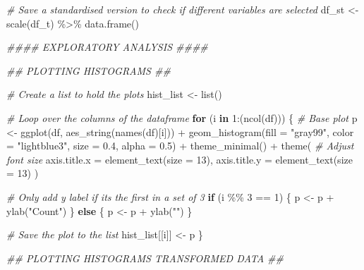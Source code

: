 \documentclass[
  11pt,
]{article}
\newenvironment{Shaded}{}{}
\newcommand{\AttributeTok}[1]{\textcolor[rgb]{0.49,0.56,0.16}{#1}}
\newcommand{\CommentTok}[1]{\textcolor[rgb]{0.38,0.63,0.69}{\textit{#1}}}
\newcommand{\ControlFlowTok}[1]{\textcolor[rgb]{0.00,0.44,0.13}{\textbf{#1}}}
\newcommand{\DecValTok}[1]{\textcolor[rgb]{0.25,0.63,0.44}{#1}}
\newcommand{\DocumentationTok}[1]{\textcolor[rgb]{0.73,0.13,0.13}{\textit{#1}}}
\newcommand{\FloatTok}[1]{\textcolor[rgb]{0.25,0.63,0.44}{#1}}
\newcommand{\FunctionTok}[1]{\textcolor[rgb]{0.02,0.16,0.49}{#1}}
\newcommand{\NormalTok}[1]{#1}
\newcommand{\OtherTok}[1]{\textcolor[rgb]{0.00,0.44,0.13}{#1}}
\newcommand{\SpecialCharTok}[1]{\textcolor[rgb]{0.25,0.44,0.63}{#1}}
\newcommand{\StringTok}[1]{\textcolor[rgb]{0.25,0.44,0.63}{#1}}
\begin{document}
\begin{Shaded}
\begin{Highlighting}[]
\CommentTok{\# Save a standardised version to check if different variables are selected}
\NormalTok{df\_st }\OtherTok{\textless{}{-}} \FunctionTok{scale}\NormalTok{(df\_t) }\SpecialCharTok{\%\textgreater{}\%} \FunctionTok{data.frame}\NormalTok{()}


\DocumentationTok{\#\#\#\# EXPLORATORY ANALYSIS \#\#\#\#}

\DocumentationTok{\#\# PLOTTING HISTOGRAMS \#\#}

\CommentTok{\# Create a list to hold the plots}
\NormalTok{hist\_list }\OtherTok{\textless{}{-}} \FunctionTok{list}\NormalTok{()}

\CommentTok{\# Loop over the columns of the dataframe}
\ControlFlowTok{for}\NormalTok{ (i }\ControlFlowTok{in} \DecValTok{1}\SpecialCharTok{:}\NormalTok{(}\FunctionTok{ncol}\NormalTok{(df))) \{}
  \CommentTok{\# Base plot}
\NormalTok{  p }\OtherTok{\textless{}{-}} \FunctionTok{ggplot}\NormalTok{(df, }\FunctionTok{aes\_string}\NormalTok{(}\FunctionTok{names}\NormalTok{(df)[i])) }\SpecialCharTok{+} 
    \FunctionTok{geom\_histogram}\NormalTok{(}\AttributeTok{fill =} \StringTok{"gray99"}\NormalTok{, }\AttributeTok{color =} \StringTok{"lightblue3"}\NormalTok{, }\AttributeTok{size =} \FloatTok{0.4}\NormalTok{, }\AttributeTok{alpha =} \FloatTok{0.5}\NormalTok{) }\SpecialCharTok{+}
    \FunctionTok{theme\_minimal}\NormalTok{() }\SpecialCharTok{+}
    \FunctionTok{theme}\NormalTok{(}
      \CommentTok{\# Adjust font size}
      \AttributeTok{axis.title.x =} \FunctionTok{element\_text}\NormalTok{(}\AttributeTok{size =} \DecValTok{13}\NormalTok{),  }
      \AttributeTok{axis.title.y =} \FunctionTok{element\_text}\NormalTok{(}\AttributeTok{size =} \DecValTok{13}\NormalTok{)   }
\NormalTok{    )}
  
  \CommentTok{\# Only add y label if it\textquotesingle{}s the first in a set of 3}
  \ControlFlowTok{if}\NormalTok{ (i }\SpecialCharTok{\%\%} \DecValTok{3} \SpecialCharTok{==} \DecValTok{1}\NormalTok{) \{}
\NormalTok{    p }\OtherTok{\textless{}{-}}\NormalTok{ p }\SpecialCharTok{+} \FunctionTok{ylab}\NormalTok{(}\StringTok{"Count"}\NormalTok{)}
\NormalTok{  \} }\ControlFlowTok{else}\NormalTok{ \{}
\NormalTok{    p }\OtherTok{\textless{}{-}}\NormalTok{ p }\SpecialCharTok{+} \FunctionTok{ylab}\NormalTok{(}\StringTok{""}\NormalTok{)}
\NormalTok{  \}}
  
  \CommentTok{\# Save the plot to the list}
\NormalTok{  hist\_list[[i]] }\OtherTok{\textless{}{-}}\NormalTok{ p}
\NormalTok{\}}


\DocumentationTok{\#\# PLOTTING HISTOGRAMS TRANSFORMED DATA \#\#}


\end{Highlighting}
\end{Shaded}
\end{document}

